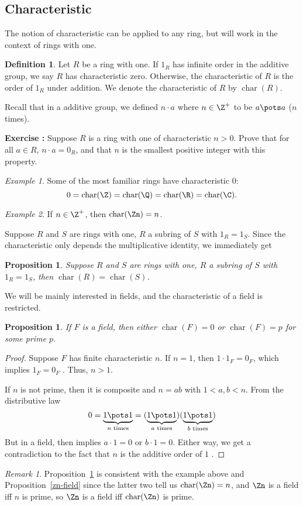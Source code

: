 \documentclass[12pt]{amsart}
\newcommand{\terminology}[1]{\textbf{\textit{#1}}}
\renewcommand{\terminology}[1]{#1}
\newcommand{\term}{\terminology}
\DeclareMathOperator{\chr}{char}
\newcounter{probs}
\newenvironment{prob}{%
  \refstepcounter{probs}
  \par\medskip\noindent\textbf{Exercise \theprobs:} }{\par\medskip}
\theoremstyle{plain}
\newtheorem{prop}[thm]{Proposition}
\theoremstyle{definition}
\newtheorem{defn}[thm]{Definition}
\theoremstyle{remark}
\newtheorem*{remark}{Remark}
\newtheorem*{exam}{Example}
\begin{document}
\subsection{Characteristic}
The notion of characteristic can be applied to any ring, but will work
in the context of rings with one.
\begin{defn}
  Let $R$ be a ring with one.  If $1_R$ has infinite order in the
  additive group, we say $R$ has \term{characteristic zero}.  Otherwise, the
  \term{characteristic} of $R$ is the order of $1_R$ under addition.  We
  denote the characteristic of $R$ by $\chr(R)$.
\end{defn}
Recall that in a additive group, we defined $n\cdot a$ where
$n\in\Z^+$ to be $a\pots a$ ($n$ times).
\begin{prob}
  Suppose $R$ is a ring with one of characteristic $n>0$.  Prove that
  for all $a\in R$,
  $n\cdot a=0_R$, and that $n$ is the smallest positive integer with
  this property.
\end{prob}
\begin{exam}
  Some of the most familiar rings have characteristic $0$:
\[ 0= \chr(\Z)=\chr(\Q)=\chr(\R)=\chr(\C). \]
\end{exam}
\begin{exam}\label{zn-char}
  If $n\in\Z^+$, then $\chr(\Zn)=n$.
\end{exam}
Suppose $R$ and $S$ are rings with one, $R$ a subring of $S$ with
$1_R=1_S$.  Since the characteristic only depends the multiplicative
identity, we immediately get
\begin{prop}
Suppose $R$ and $S$ are rings with one, $R$ a subring of $S$ with
$1_R=1_S$, then $\chr(R)=\chr(S)$.
\end{prop}
We will be mainly interested in fields, and the characteristic of a
field is restricted.
\begin{prop} \label{field-char}
  If $F$ is a field, then either $\chr(F)=0$ or $\chr(F)=p$ for some
  prime $p$.
\end{prop}
\begin{proof}
  Suppose $F$ has finite characteristic $n$.  If $n=1$, then $1\cdot
  1_F=0_F$, which implies $1_F=0_F$ \con.  Thus, $n>1$.

  If $n$ is not prime, then it is composite and $n=ab$ with
  $1<a,b<n$.  From the distributive law
\[ 0=\underbrace{1\pots 1}_\text{$n$ times}  =  (\underbrace{1\pots
  1}_\text{$a$ times}) (\underbrace{1\pots 1}_\text{$b$ times})\]
But in a field, then implies $a\cdot 1=0$ or $b\cdot 1=0$.  Either
way, we get a contradiction to the fact that $n$ is the additive order
of $1$ \con.
\end{proof}
\begin{remark}
  Proposition~\ref{field-char} is consistent with the
  example above and Proposition~\ref{zn-field} since the
  latter two tell us $\chr(\Zn)=n$, and $\Zn$ is a field iff $n$ is
  prime, so $\Zn$ is a field iff $\chr(\Zn)$ is prime.
\end{remark}
\end{document}
